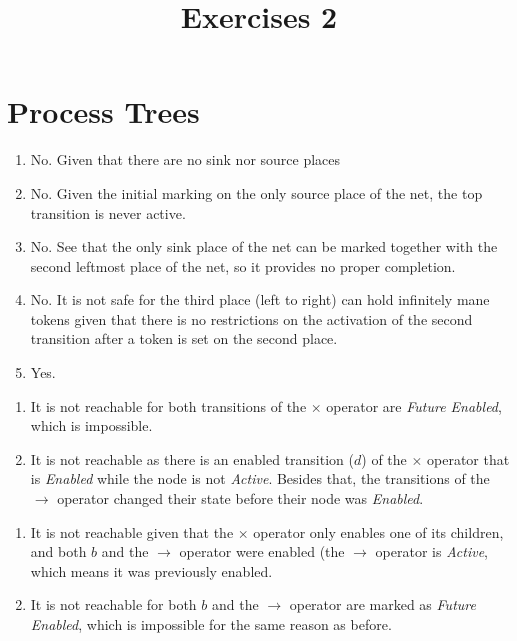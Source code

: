 \documentclass[a4paper]{report}
\title{Exercises 2}
\begin{document}
\maketitle

\section*{Process Trees}


\begin{enumerate}
    \item No. Given that there are no sink nor source places
    \item No. Given the initial marking on the only source place of the net, the top transition is
	never active.
    \item No. See that the only sink place of the net can be marked together with the second
	leftmost place of the net, so it provides no proper completion.
    \item No. It is not safe for the third place (left to right) can hold infinitely mane tokens
	given that there is no restrictions on the activation of the second transition after a token
	is set on the second place.
    \item Yes.
\end{enumerate}



\begin{enumerate}
    \item It is not reachable for both transitions of the $\times $ operator are \emph{Future
	Enabled}, which is impossible.
    \item It is not reachable as there is an enabled transition ($d$) of the $\times $ operator that
	is \emph{Enabled} while the node is not \emph{Active}. Besides that, the transitions
	of the $\to $ operator changed their state before their node was \emph{Enabled}.
\end{enumerate}


\begin{enumerate}
    \item It is not reachable given that the $\times $ operator only enables one of its children,
	and both $b$ and the $\to $ operator were enabled (the $\to $ operator is
	\emph{Active}, which means it was previously enabled.
    \item It is not reachable for both $b$ and the $\to $ operator are marked as \emph{Future
	Enabled}, which is impossible for the same reason as before.
\end{enumerate}
\end{document}
